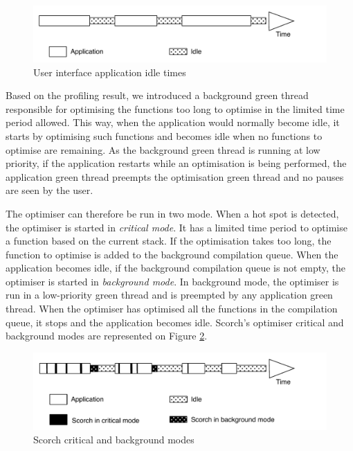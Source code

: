 \documentclass[a4paper,12pt,twoside]{../includes/ThesisStyle}
\begin{document}
\begin{figure}[h!]
    \begin{center}
        \includegraphics[width=0.95\linewidth]{ApplicationIdle}
        \caption{User interface application idle times}
        \label{fig:ApplicationIdle}
    \end{center}
\end{figure}

Based on the profiling result, we introduced a background green thread responsible for optimising the functions too long to optimise in the limited time period allowed. This way, when the application would normally become idle, it starts by optimising such functions and becomes idle when no functions to optimise are remaining. As the background green thread is running at low priority, if the application restarts while an optimisation is being performed, the application green thread preempts the optimisation green thread and no pauses are seen by the user.

The optimiser can therefore be run in two mode. When a hot spot is detected, the optimiser is started in \emph{critical mode}. It has a limited time period to optimise a function based on the current stack. If the optimisation takes too long, the function to optimise is added to the background compilation queue. When the application becomes idle, if the background compilation queue is not empty, the optimiser is started in \emph{background mode}. In background mode, the optimiser is run in a low-priority green thread and is preempted by any application green thread. When the optimiser has optimised all the functions in the compilation queue, it stops and the application becomes idle. Scorch's optimiser critical and background modes are represented on Figure \ref{fig:ScorchModes}.

\begin{figure}[h!]
    \begin{center}
        \includegraphics[width=0.95\linewidth]{ScorchModes}
        \caption{Scorch critical and background modes}
        \label{fig:ScorchModes}
    \end{center}
\end{figure}
\end{document}
